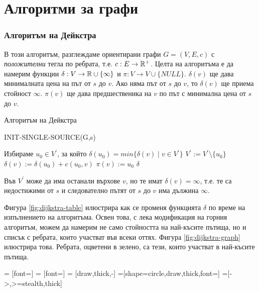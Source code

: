 \chapter {Алгоритми за графи}

\subsection{Алгоритъм на Дейкстра}

В този алгоритъм, разглеждаме ориентирани графи $G = (V,E,c)$ с {\em положителни} тегла по ребрата, т.е. $c:E\to\mathbb{R}^+$. 
Целта на алгоритъма е да намерим функции $\delta: V\to\mathbb{R}\cup\{\infty\}$ и $\pi:V\to V\cup\{NULL\}$.
$\delta(v)$ ще дава минималната цена на път от $s$ до $v$. Ако няма път от $s$ до $v$, то $\delta(v)$
ще приема стойност $\infty$. $\pi(v)$ ще дава предшественика на $v$ по път с минимална цена от $s$ до $v$.

\begin{algorithm}
\caption{Алгоритъм на Дейкстра}
\label{alg:dijkstra}

\begin{algorithmic}[1]
  \STATE INIT-SINGLE-SOURCE(G,s)
  
  \STATE Избираме $u_0\in V^\prime$, за който $ \delta(u_0) = min\{\delta(v)\mid v\in V^\prime\} $
  \STATE $V^\prime := V^\prime\setminus\{u_0\}$
  \STATE $\delta(v):= \delta(u_0)+c(u_0,v)$
  \STATE $\pi(v) := u_0$
  \ENDIF
  \ENDFOR
  \ENDWHILE
  \RETURN $\delta$
\end{algorithmic}
\end{algorithm}

Във $V^\prime$ може да има останали върхове $v$, но те имат $\delta(v) = \infty$, т.е.
те са недостижими от $s$ и следователно пътят от $s$ до $v$ има дължина $\infty$.

Фигура \ref{fig:dijkstra-table} илюстрира как се променя функцията $\delta$ по време на изпълнението на алгоритъма.
Освен това, с лека модификация на горния алгоритъм, можем да намерим не само стойността на най-късите пътища, но
и списък с ребрата, които участват във всеки оттях. Фигура \ref{fig:dijkstra-graph} илюстрира това.
Ребрата, оцветени в зелено, са тези, които участват в най-късите пътища.

 = [font=\small]
 = [font=\small]
 = [draw,thick,-]
=[shape=circle,draw,thick,font=\small]
=[->,>=stealth,thick]

